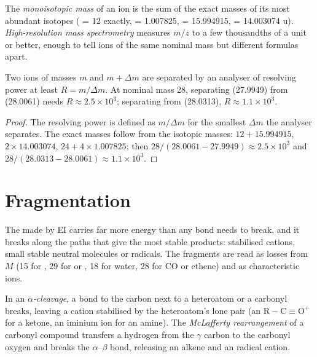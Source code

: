 \begin{definition}\label{def:b2:mass-spec-atomic:exact-mass}
The \emph{monoisotopic mass} of an ion is the sum of the exact masses of its
most abundant isotopes ( = 12 exactly,  = 1.007825,  = 15.994915,
 = 14.003074 u). \emph{High-resolution mass spectrometry} measures $m/z$ to a few thousandths of a unit or better, enough to tell ions of the same
nominal mass but different formulas apart.
\end{definition}

\begin{proposition}\label{prop:b2:mass-spec-atomic:resolving}
Two ions of masses $m$ and $m + \Delta m$ are separated by an analyser of resolving power at least
$R = m/\Delta m$. At nominal mass 28, separating  (27.9949) from  (28.0061) needs $R
\approx 2.5 \times 10^3$; separating  from  (28.0313), $R \approx 1.1 \times 10^3$.
\end{proposition}

\begin{proof}
The resolving power is defined as $m/\Delta m$ for the smallest $\Delta m$ the analyser separates. The
exact masses follow from the isotopic masses: $12 + 15.994915$, $2 \times 14.003074$, $24 + 4 \times
1.007825$; then $28/(28.0061 - 27.9949) \approx 2.5 \times 10^3$ and $28/(28.0313 - 28.0061) \approx
1.1 \times 10^3$.
\end{proof}

\section{Fragmentation}

The  made by EI carries far more energy than any bond needs to break, and it breaks along
the paths that give the most stable products: stabilised cations, small stable neutral molecules or
radicals. The fragments are read as losses from $M$ (15 for , 29 for  or , 18
for water, 28 for CO or ethene) and as characteristic ions.

\begin{definition}\label{def:b2:mass-spec-atomic:fragmentation}
In an \emph{$\alpha$-cleavage}, a bond to the carbon next to a
heteroatom or a carbonyl breaks, leaving a cation stabilised by the heteroatom's lone pair (an  $\mathrm{R{-}C{\equiv}O^+}$ for a ketone, an iminium ion for an amine). The \emph{McLafferty
rearrangement} of a carbonyl compound transfers a hydrogen from the
$\gamma$ carbon to the carbonyl oxygen and breaks the $\alpha$--$\beta$ bond, releasing an alkene and an
 radical cation.
\end{definition}


